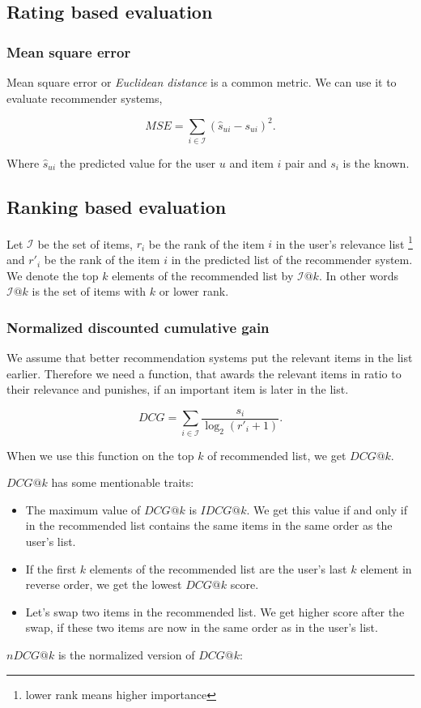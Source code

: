 \subsection{Rating based evaluation }

\subsubsection{Mean square error}
Mean square error or \emph{Euclidean distance} is a common metric. We can use it to
evaluate recommender systems,

\[MSE=\sum_{i\in\mathcal{I}}(\hat{s}_{ui} - s_{ui})^2.\]

Where $\hat{s}_{ui}$ the predicted value for the user $u$ and item $i$ pair and $s_i$ is the known.


\subsection{Ranking based evaluation}
Let $\mathcal{I}$ be the set of items, $r_i$ be the rank of the item $i$ in the
user's relevance list \footnote{lower rank means higher importance}  and
$r'_i$ be the rank of the item $i$ in the predicted list of the recommender system.
We denote the top $k$ elements of the recommended list by $\mathcal{I}@k$. In other words
$\mathcal{I}@k$ is the set of items with $k$ or lower rank. 

\subsubsection{Normalized discounted cumulative gain}
We assume that better recommendation systems put the relevant items
in the list earlier. Therefore we need a function, that awards the relevant items
in ratio to their relevance and punishes, if an important item is later in the
list. 

$$ DCG=\sum_{i \in \mathcal{I}}\frac{s_i}{\log_2(r'_i+1)}.$$

When we use this function on the top $k$ of recommended list, we get $DCG@k$.

$DCG@k$ has some mentionable traits:
\begin{itemize}
\item The maximum value of $DCG@k$ is $IDCG@k$. We get this value if and only if in the
  recommended list contains the same items in the same order as the user's list.
\item If the first $k$ elements of the recommended list are the user's last $k$ element in
  reverse order, we get the lowest $DCG@k$ score.
\item Let's swap two items in the recommended list. We get higher score after the
  swap, if these two items are now in the same order as in the user's list.
\end{itemize}
$nDCG@k$ is the normalized version of $DCG@k$:

